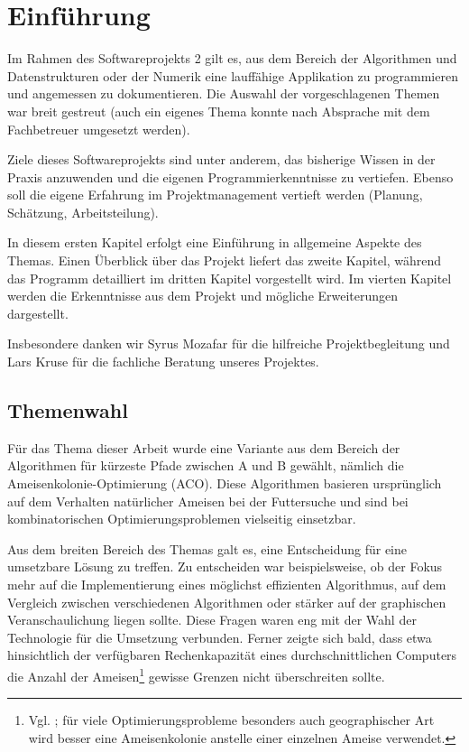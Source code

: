 

\chapter{Einführung}

Im Rahmen des Softwareprojekts 2 gilt es, aus dem Bereich der Algorithmen und
Datenstrukturen oder der Numerik eine lauffähige Applikation zu programmieren
und angemessen zu dokumentieren. Die Auswahl der vorgeschlagenen Themen war
breit gestreut (auch ein eigenes Thema konnte nach Absprache mit dem
Fachbetreuer umgesetzt werden).

Ziele dieses Softwareprojekts sind unter anderem, das bisherige Wissen in der
Praxis anzuwenden und die eigenen Programmierkenntnisse zu vertiefen. Ebenso
soll die eigene Erfahrung im Projektmanagement vertieft werden (Planung, 
Schätzung, Arbeitsteilung).

In diesem ersten Kapitel erfolgt eine Einführung in allgemeine Aspekte des
Themas. Einen Überblick über das Projekt liefert das zweite Kapitel, während das
Programm detailliert im dritten Kapitel vorgestellt wird. Im vierten Kapitel
werden die Erkenntnisse aus dem Projekt und mögliche Erweiterungen dargestellt.

Insbesondere danken wir Syrus Mozafar für die hilfreiche
Projektbegleitung und Lars Kruse für die fachliche Beratung unseres Projektes.

\section{Themenwahl}

Für das Thema dieser Arbeit wurde eine Variante aus dem Bereich der Algorithmen
für kürzeste Pfade zwischen A und B gewählt, nämlich die
Ameisenkolonie-Optimierung (ACO). Diese Algorithmen basieren ursprünglich auf
dem Verhalten natürlicher Ameisen bei der Futtersuche und sind bei
kombinatorischen Optimierungsproblemen vielseitig einsetzbar.

Aus dem breiten Bereich des Themas galt es, eine Entscheidung für eine
umsetzbare Lösung zu treffen. Zu entscheiden war beispielsweise, ob der Fokus
mehr auf die Implementierung eines möglichst effizienten Algorithmus, auf dem
Vergleich zwischen verschiedenen Algorithmen oder stärker auf der graphischen
Veranschaulichung liegen sollte. Diese Fragen waren eng mit der Wahl der
Technologie für die Umsetzung verbunden. Ferner zeigte sich bald, dass
etwa hinsichtlich der verfügbaren Rechenkapazität eines durchschnittlichen
Computers die Anzahl der Ameisen\footnote{Vgl. \citet*[S. 217]{ds-ant}; für
viele Optimierungsprobleme besonders auch geographischer Art wird besser eine
Ameisenkolonie anstelle einer einzelnen Ameise verwendet.} gewisse
Grenzen nicht überschreiten sollte.

